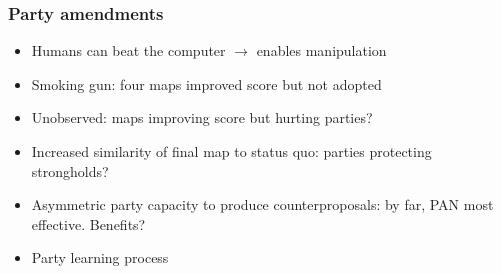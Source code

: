 \documentclass[xcolor=dvipsnames]{beamer}  %
\begin{document}
\begin{frame}                                       %

    \frametitle{Party amendments}
\begin{itemize}
\item Humans can beat the computer $\rightarrow$ enables manipulation 
\item Smoking gun: four maps improved score but \alert{not} adopted
\item Unobserved: maps improving score but hurting parties?
\item Increased similarity of final map to status quo: parties protecting strongholds?
\item Asymmetric party capacity to produce counterproposals: by far, PAN most effective. Benefits?
\item Party learning process 
\end{itemize} 

\end{frame}
\end{document}

